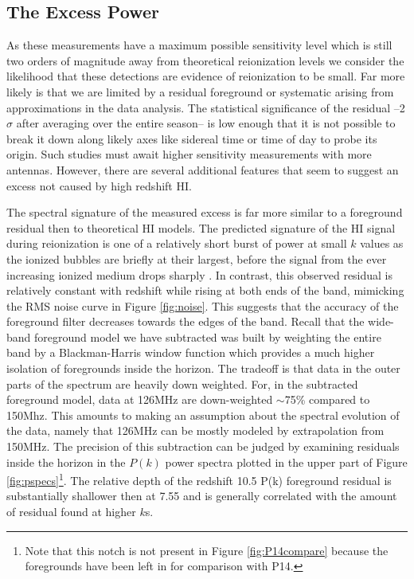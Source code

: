 \documentclass[preprint2]{aastex}
\begin{document}
\subsection{The Excess Power}
\label{sec:excess power}
As these measurements have a maximum possible sensitivity level which is still two orders of magnitude away from theoretical reionization levels we consider the likelihood that these detections are evidence of reionization to be small. Far more likely is that we are limited by a residual foreground or systematic arising from approximations in the data analysis.  The statistical significance of the residual --2$\sigma$ after averaging over the entire season-- is low enough that it is not possible to break it down along likely axes like sidereal time or time of day to probe its origin.  Such studies must await higher sensitivity measurements with more antennas.  However, there are several additional features that seem to suggest an excess not caused by high redshift HI.

The spectral signature of the measured excess is far more similar to a foreground residual then to theoretical HI models.
The predicted signature of the HI signal during reionization is one of a relatively short burst of power at small $k$ values as the ionized bubbles are briefly at their largest, before the signal from the ever increasing ionized medium drops sharply \citep{Pritchard:2008p8123}. In contrast, this observed residual is relatively constant with redshift while rising at both ends of the band, mimicking the RMS noise curve in Figure \ref{fig:noise}.  This suggests that the accuracy of the foreground filter decreases towards the edges of the band.  Recall that the wide-band foreground model we have subtracted was built by weighting the entire band by a Blackman-Harris window function which provides a much higher isolation of foregrounds inside the horizon. The tradeoff is that data in the outer parts of the spectrum are heavily down weighted.  For, in the subtracted foreground model, data at 126MHz are down-weighted $\sim$75\% compared to 150Mhz.  This amounts to making an assumption about the spectral evolution of the data, namely that 126MHz can be mostly modeled by extrapolation from 150MHz.  The precision of this subtraction can be judged by examining residuals inside the horizon in the $P(k)$ power spectra plotted in the upper part of Figure \ref{fig:pspecs}\footnote{Note that this notch is not present in Figure \ref{fig:P14compare} because the foregrounds have been left in for comparison with P14.}.  The relative depth of the redshift 10.5 P(k) foreground residual is substantially shallower then at 7.55 and is generally correlated with the amount of residual found at higher $k$s.
\end{document}
